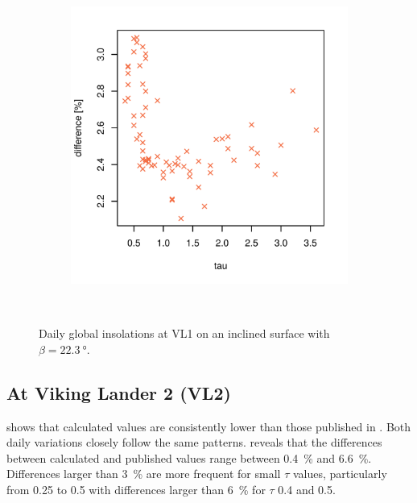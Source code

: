 \begin{figure}[h]
\begin{subfigure}[t]{\subfigureWidth}
            \includegraphics[height=\graphicsHeight]{sections/appendix/insolation-calculation-verification/plots/h-diff-bet-exp-calc-at-vl1-with-beta-223-deg.png}
            \label{fig:sub:comparative-global-insolation-at-vl1-beta-equals-phi-percentage-differences}
    \end{subfigure}\\[0.8ex]
    \caption[Daily global insolations at Viking Lander 1 on an inclined surface with $\beta=\SI{22.3}{\degree}$]
    {Daily global insolations at \ac{VL1} on an inclined surface with $\beta=\SI{22.3}{\degree}$.}
    \label{fig:plot:comparative-global-insolation-at-vl1-beta-equals-phi}
\vspace{-2ex}
\end{figure}

\subsection{At Viking Lander 2 (VL2)}
 shows that calculated values are consistently lower than those published in . Both daily variations closely follow the same patterns.  reveals that the differences between calculated and published values range between \SI{0.4}{\percent} and \SI{6.6}{\percent}. Differences larger than \SI{3}{\percent} are more frequent for small $\tau$ values, particularly from 0.25 to 0.5 with differences larger than \SI{6}{\percent} for $\tau$ 0.4 and 0.5.

